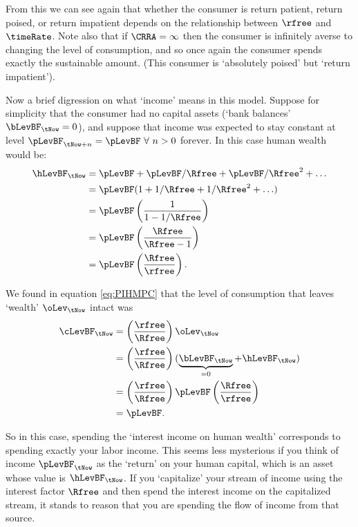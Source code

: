 From this we can see again that whether the consumer is return patient, return poised, or return impatient
depends on the relationship between $\rfree$ and $\timeRate$.  Note also that
if $\CRRA = \infty$ then the consumer is infinitely averse to changing
the level of consumption, and so once again the consumer spends
exactly the sustainable amount.  (This consumer is `absolutely poised' but `return impatient').


Now a  brief digression on what `income' means in this model.  Suppose
for simplicity that the consumer had no capital assets (`bank balances' $\bLevBF_{\tNow}=0$), and suppose
that income was expected to stay constant at level $\pLevBF_{\tNow+n}=\pLevBF~\forall~n>0$ forever.
In this case human wealth would be:
\begin{equation*}
  \begin{gathered}
    \begin{aligned}
        \hLevBF_{\tNow} & = \pLevBF+\pLevBF/\Rfree+\pLevBF/\Rfree^{2}+\ldots  \\
         & = \pLevBF(1+1/\Rfree+1/\Rfree^{2}+\ldots)  \\
         & = \pLevBF\left(\frac{1}{1-1/\Rfree}\right)
\\   & = \pLevBF\left(\frac{\Rfree}{\Rfree -1}\right)
\\   & = \pLevBF\left(\frac{\Rfree}{\rfree}\right)
.
\end{aligned}
\end{gathered}
\end{equation*}


We found in equation \eqref{eq:PIHMPC} that
the level of consumption that leaves `wealth' $\oLev_{\tNow}$ intact
was
\begin{equation}\begin{gathered}\begin{aligned}
        \cLevBF_{\tNow} & =  \left(\frac{\rfree}{\Rfree}\right) \oLev_{\tNow}  \\
         & =  \left(\frac{\rfree}{\Rfree}\right) (\underbrace{\bLevBF_{\tNow}}_{=0}+\hLevBF_{\tNow}) \\
                        & =  \left(\frac{\rfree}{\Rfree}\right)     \pLevBF \left(\frac{\Rfree}{\rfree}\right)\\
                        & =  \pLevBF.
\end{aligned}\end{gathered}\end{equation}

So in this case, spending the `interest income on human wealth'
corresponds to spending exactly your labor income.  This seems less
mysterious if you think of income $\pLevBF_{\tNow}$ as the `return' on your
human capital, which is an asset whose value is $\hLevBF_{\tNow}$.  If you `capitalize' your stream of
income using the interest factor $\Rfree$ and then spend the interest income on the
capitalized stream, it stands to reason that you are spending the flow
of income from that source.

